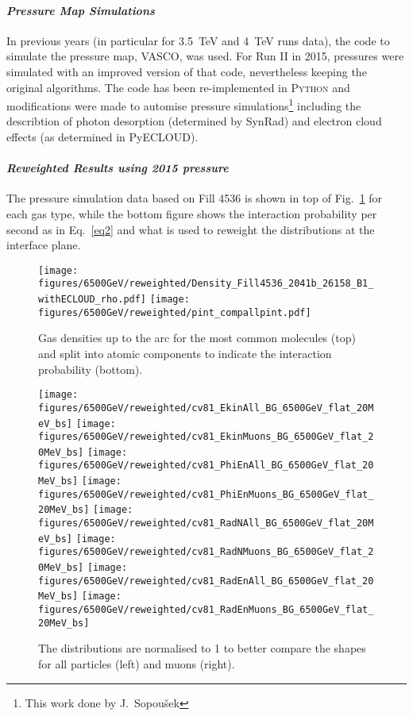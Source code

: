 \paragraph{\textit{Pressure Map Simulations}}
In previous years (in particular for 3.5~TeV and 4~TeV runs data), the code to simulate the pressure map, VASCO, was used. For Run II in 2015, pressures were simulated with an improved version of that code, nevertheless keeping the original algorithms. The code has been re-implemented in \textsc{Python} and modifications were made to automise pressure simulations\footnote{This work done by J.~Sopoušek} including the describtion of photon desorption (determined by SynRad) and electron cloud effects (as determined in PyECLOUD). 

\paragraph{\textit{Reweighted Results using 2015 pressure}}

The pressure simulation data based on Fill 4536 is shown in top of Fig.~\ref{pressure2015} for each gas type, while the bottom figure shows the interaction probability per second as in Eq.~\ref{eq2} and what is used to reweight the distributions at the interface plane.

\begin{figure}
\begin{center}
  \texttt{[image: figures/6500GeV/reweighted/Density\_Fill4536\_2041b\_26158\_B1\_withECLOUD\_rho.pdf]}
  \texttt{[image: figures/6500GeV/reweighted/pint\_compallpint.pdf]}
\end{center}
\vspace{-0.6cm}
 \caption{Gas densities up to the arc for the most common molecules (top) and split into atomic components to indicate the interaction probability (bottom).
  \label{pressure2015}}
\end{figure}

\begin{figure}
\begin{center}
  \texttt{[image: figures/6500GeV/reweighted/cv81\_EkinAll\_BG\_6500GeV\_flat\_20MeV\_bs]}
  \texttt{[image: figures/6500GeV/reweighted/cv81\_EkinMuons\_BG\_6500GeV\_flat\_20MeV\_bs]}
  \texttt{[image: figures/6500GeV/reweighted/cv81\_PhiEnAll\_BG\_6500GeV\_flat\_20MeV\_bs]}
  \texttt{[image: figures/6500GeV/reweighted/cv81\_PhiEnMuons\_BG\_6500GeV\_flat\_20MeV\_bs]}
  \texttt{[image: figures/6500GeV/reweighted/cv81\_RadNAll\_BG\_6500GeV\_flat\_20MeV\_bs]}
  \texttt{[image: figures/6500GeV/reweighted/cv81\_RadNMuons\_BG\_6500GeV\_flat\_20MeV\_bs]}
  \texttt{[image: figures/6500GeV/reweighted/cv81\_RadEnAll\_BG\_6500GeV\_flat\_20MeV\_bs]}
  \texttt{[image: figures/6500GeV/reweighted/cv81\_RadEnMuons\_BG\_6500GeV\_flat\_20MeV\_bs]}
\end{center}
\vspace{-0.6cm}
 \caption{The distributions are normalised to 1 to better compare the shapes for all particles (left) and muons (right).
  \label{fig:EkinPhiEn6p5}}
\end{figure}

